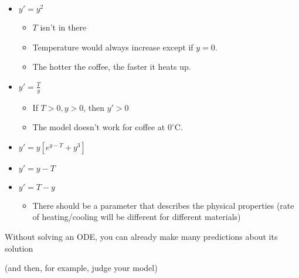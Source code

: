 \begin{itemize}
\begin{example}
              \begin{itemize}
                  \item $y'=y^2$
                        \begin{itemize}
                            \item $T$ isn't in there
                            \item Temperature would always increase except if $y=0$.
                            \item The hotter the coffee, the faster it heats up.
                        \end{itemize}
                  \item $y'=\frac{T}{y}$
                        \begin{itemize}
                            \item If $T>0, y>0$, then $y'>0$
                            \item The model doesn't work for coffee at $0^\circ \text{C}$.
                        \end{itemize}
                  \item $y'=y[e^{y-T}+y^3]$
                  \item $y'=y-T$
                  \item $y'=T-y$
                        \begin{itemize}
                            \item There should be a parameter that describes the physical properties (rate of heating/cooling will be different for different materials)
                        \end{itemize}
              \end{itemize}
          \end{example}
          \begin{idea}
            Without solving an ODE, you can already make many predictions about its solution
            \vspace{2mm}

            (and then, for example, judge your model)
          \end{idea}
\end{itemize}